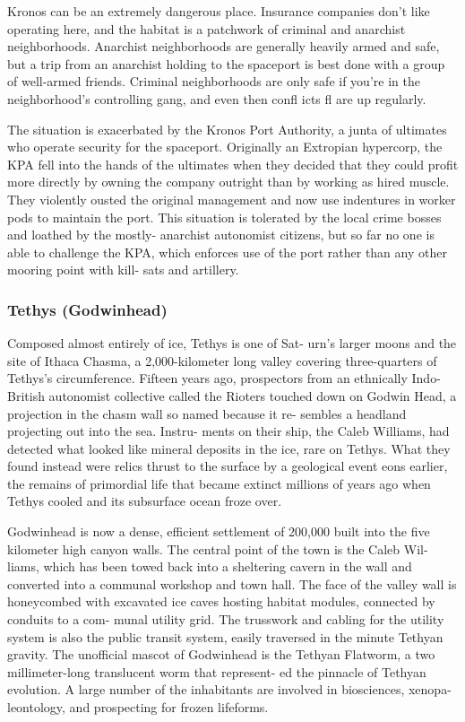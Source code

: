 Kronos can be an extremely dangerous place. 
Insurance companies don't like operating here, and 
the habitat is a patchwork of criminal and anarchist 
neighborhoods. Anarchist neighborhoods are generally 
heavily armed and safe, but a trip from an anarchist 
holding to the spaceport is best done with a group of 
well-armed friends. Criminal neighborhoods are only 
safe if you're in the neighborhood's controlling gang, 
and even then confl icts fl are up regularly.

The situation is exacerbated by the Kronos Port 
Authority, a junta of ultimates who operate security 
for the spaceport. Originally an Extropian hypercorp, 
the KPA fell into the hands of the ultimates when 
they decided that they could profit more directly 
by owning the company outright than by working 
as hired muscle. They violently ousted the original 
management and now use indentures in worker pods 
to maintain the port. This situation is tolerated by 
the local crime bosses and loathed by the mostly-
anarchist autonomist citizens, but so far no one is 
able to challenge the KPA, which enforces use of the 
port rather than any other mooring point with kill-
sats and artillery.

\subsubsection{Tethys (Godwinhead)}

Composed almost entirely of ice, Tethys is one of Sat-
urn's larger moons and the site of Ithaca Chasma, a 
2,000-kilometer long valley covering three-quarters of 
Tethys's circumference. Fifteen years ago, prospectors 
from an ethnically Indo-British autonomist collective 
called the Rioters touched down on Godwin Head, a 
projection in the chasm wall so named because it re-
sembles a headland projecting out into the sea. Instru-
ments on their ship, the Caleb Williams, had detected 
what looked like mineral deposits in the ice, rare on 
Tethys. What they found instead were relics thrust 
to the surface by a geological event eons earlier, the 
remains of primordial life that became extinct millions 
of years ago when Tethys cooled and its subsurface 
ocean froze over.

Godwinhead is now a dense, efficient  settlement 
of 200,000 built into the five kilometer high canyon 
walls. The central point of the town is the Caleb Wil-
liams, which has been towed back into a sheltering 
cavern in the wall and converted into a communal 
workshop and town hall. The face of the valley wall 
is honeycombed with excavated ice caves hosting 
habitat modules, connected by conduits to a com-
munal utility grid. The trusswork and cabling for the 
utility system is also the public transit system, easily 
traversed in the minute Tethyan gravity. The unofficial 
mascot of Godwinhead is the Tethyan Flatworm, a 
two millimeter-long translucent worm that represent-
ed the pinnacle of Tethyan evolution. A large number 
of the inhabitants are involved in biosciences, xenopa-
leontology, and prospecting for frozen lifeforms.

